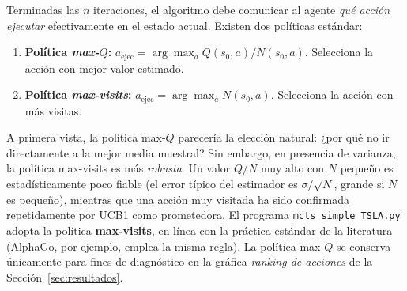 Terminadas las $n$ iteraciones, el algoritmo debe comunicar al agente \emph{qué acción ejecutar} efectivamente en el estado actual. Existen dos políticas estándar:

\begin{enumerate}
    \item \textbf{Política \emph{max-$Q$}:} $a_{\text{ejec}} = \arg\max_a Q(s_0,a) / N(s_0,a)$. Selecciona la acción con mejor valor estimado.
    \item \textbf{Política \emph{max-visits}:} $a_{\text{ejec}} = \arg\max_a N(s_0,a)$. Selecciona la acción con más visitas.
\end{enumerate}

A primera vista, la política max-$Q$ parecería la elección natural: ¿por qué no ir directamente a la mejor media muestral? Sin embargo, en presencia de varianza, la política max-visits es más \emph{robusta}. Un valor $Q/N$ muy alto con $N$ pequeño es estadísticamente poco fiable (el error típico del estimador es $\sigma / \sqrt{N}$, grande si $N$ es pequeño), mientras que una acción muy visitada ha sido confirmada repetidamente por UCB1 como prometedora. El programa \texttt{mcts\_simple\_TSLA.py} adopta la política \textbf{max-visits}, en línea con la práctica estándar de la literatura (AlphaGo, por ejemplo, emplea la misma regla). La política max-$Q$ se conserva únicamente para fines de diagnóstico en la gráfica \emph{ranking de acciones} de la Sección~\ref{sec:resultados}.
